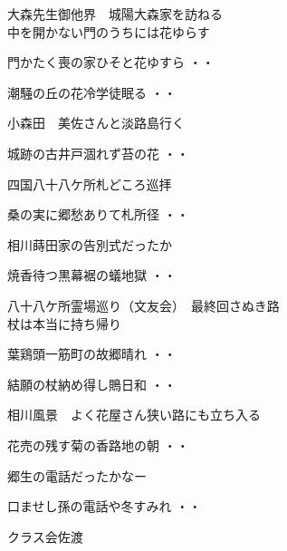 \vspace{0.6cm}
大森先生御他界　城陽大森家を訪ねる
\\中を開かない門のうちには花ゆらす
\vspace{0.6cm}
\begin{shiika}門かたく喪の家ひそと花ゆすら
\hfill{・・}\end{shiika}
\vspace{0.6cm}
\begin{shiika}潮騒の丘の花冷学徒眠る
\hfill{・・}\end{shiika}
\vspace{0.6cm}
小森田　美佐さんと淡路島行く
\begin{shiika}城跡の古井戸涸れず苔の花
\hfill{・・}\end{shiika}
\vspace{0.6cm}
四国八十八ケ所札どころ巡拝
\begin{shiika}桑の実に郷愁ありて札所径
\hfill{・・}\end{shiika}
\vspace{0.6cm}
相川蒔田家の告別式だったか
\begin{shiika}焼香待つ黒幕裾の蟻地獄
\hfill{・・}\end{shiika}
\vspace{0.6cm}
八十八ケ所霊場巡り（文友会）　最終回さぬき路\\杖は本当に持ち帰り
\begin{shiika}葉鶏頭一筋町の故郷晴れ
\hfill{・・}\end{shiika}
\begin{shiika}結願の杖納め得し鵙日和
\hfill{・・}\end{shiika}
\vspace{0.6cm}
相川風景　よく花屋さん狭い路にも立ち入る
\begin{shiika}花売の残す菊の香路地の朝
\hfill{・・}\end{shiika}
\vspace{0.6cm}
郷生の電話だったかなー
\begin{shiika}口ませし孫の電話や冬すみれ
\hfill{・・}\end{shiika}
\vspace{0.6cm}
クラス会佐渡
